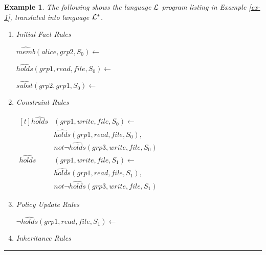\documentclass[11pt, twocolumn]{article}
\newtheorem{vexmpl}{Example}
\newenvironment{vexample}
  {\begin{vexmpl}\rm}
  {\rule{2mm}{2mm}\end{vexmpl}}
\begin{document}
        \begin{vexample}
          \label{ex-2}
          The following shows the language ${\cal L}$ program listing in
          Example \ref{ex-1},  translated into language ${\cal L}^{*}$.

          \begin{enumerate}
            \item
              Initial Fact Rules

              $\hat{memb}(alice, grp2, S_{0}) \leftarrow$

              $\hat{holds}(grp1, read, file,S_{0}) \leftarrow$

              $\hat{subst}(grp2, grp1, S_{0}) \leftarrow$

            \item
              Constraint Rules

              \begin{math}
                \begin{aligned}[t]
                  \hat{holds}&(grp1, write, file, S_{0}) \leftarrow \\
                  & \hat{holds}(grp1, read, file, S_{0}), \\
                  & not \lnot \hat{holds}(grp3, write, file, S_{0}) \\
                  \hat{holds}&(grp1, write, file, S_{1}) \leftarrow \\
                  & \hat{holds}(grp1, read, file, S_{1}), \\
                  & not \lnot \hat{holds}(grp3, write, file, S_{1})
                \end{aligned}
              \end{math}

            \item
              Policy Update Rules

              \begin{math}
                \lnot \hat{holds}(grp1, read, file, S_{1}) \leftarrow
              \end{math}

            \item
              Inheritance Rules


\end{enumerate}
\end{vexample}
\end{document}
